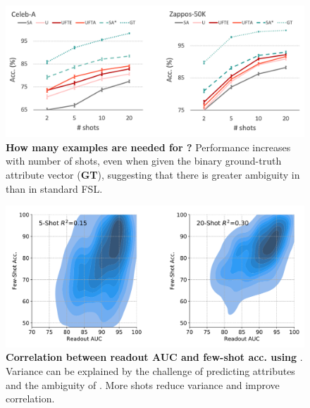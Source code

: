 \iflatexml
\begin{figure}
\includegraphics[width=6\textwidth]{figures/celeb-a-zappos-nshot.png}
\caption{\textbf{How many examples are needed for \taskname{}?} Performance
increases with number of shots, even when given the binary ground-truth
attribute vector (\textbf{GT}), suggesting that there is greater ambiguity in \taskname{} than in standard FSL.}
\label{fig:nshot}
\end{figure}

\begin{figure}
\includegraphics[width=6\textwidth]{figures/test-s5-s20.png}
\caption{\textbf{Correlation between readout AUC and few-shot acc. using
\uftsa}. Variance can be explained by the challenge of predicting attributes
and the ambiguity of \taskname{}. More shots reduce variance and improve
correlation.}
\label{fig:corr}
\end{figure}

\else

